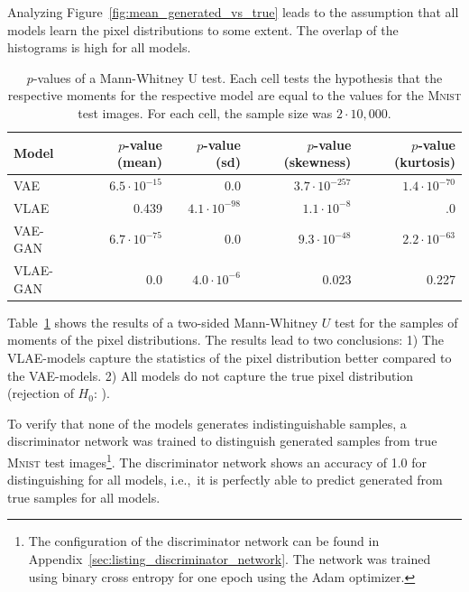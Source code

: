 Analyzing Figure~\ref{fig:mean_generated_vs_true} leads to the assumption that all models learn the pixel distributions to some extent.
The overlap of the histograms is high for all models.
\begin{table}
    \begin{tabular}{lrrrr}
        \toprule
        Model              & $p$-value (mean)    & $p$-value (sd)      & $p$-value (skewness) & $p$-value (kurtosis) \\
        \midrule
        \ac{VAE}           & $6.5\cdot 10^{-15}$ & 0.0                 & $3.7\cdot 10^{-257}$ & $1.4\cdot 10^{-70}$  \\
        \ac{VLAE}          & 0.439               & $4.1\cdot 10^{-98}$ & $1.1\cdot 10^{-8}$   & .0                   \\
        \ac{VAE}-\ac{GAN}  & $6.7\cdot 10^{-75}$ & 0.0                 & $9.3\cdot 10^{-48}$  & $2.2\cdot 10^{-63}$  \\
        \ac{VLAE}-\ac{GAN} & 0.0                 & $4.0\cdot 10^{-6}$  & 0.023                & 0.227                \\
        \bottomrule
    \end{tabular}
    \caption{$p$-values of a Mann-Whitney U test. Each cell tests the hypothesis that the respective moments for the respective model are equal to the values for the \textsc{Mnist} test images. For each cell, the sample size was $2\cdot 10,000$.}
    \label{tab:vae-vlae-mnist}
\end{table}
Table~\ref{tab:vae-vlae-mnist} shows the results of a two-sided Mann-Whitney $U$ test for the samples of moments of the pixel distributions.
The results lead to two conclusions: 1) The \ac{VLAE}-models capture the statistics of the pixel distribution better compared to the \ac{VAE}-models.
2) All models do not capture the true pixel distribution (rejection of $H_0$: ).

To verify that none of the models generates indistinguishable samples, a discriminator network was trained to distinguish generated samples from true \textsc{Mnist} test images\footnote{The configuration of the discriminator network can be found in Appendix~\ref{sec:listing_discriminator_network}. The network was trained using binary cross entropy for one epoch using the Adam optimizer.}.
The discriminator network shows an accuracy of 1.0 for distinguishing for all models, i.e.,~it is perfectly able to predict generated from true samples for all models.

